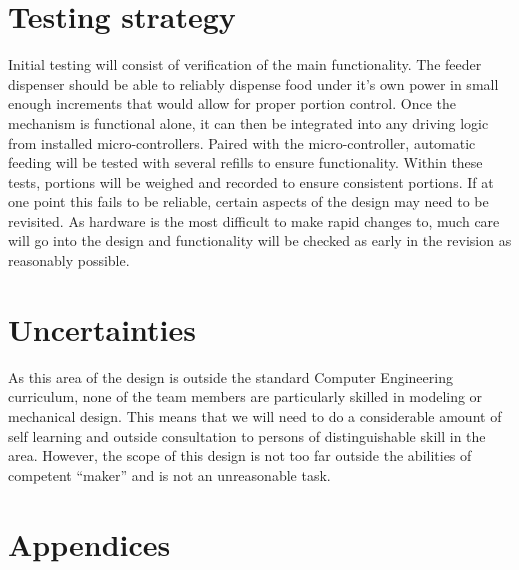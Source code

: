 \documentclass[12pt]{article}
\begin{document}
\section{Testing strategy}
Initial testing will consist of verification of the main functionality. The feeder dispenser should be able to reliably dispense food under it’s own power in small enough increments that would allow for proper portion control. Once the mechanism is functional alone, it can then be integrated into any driving logic from installed micro-controllers. Paired with the micro-controller, automatic feeding will be tested with several refills to ensure functionality. Within these tests, portions will be weighed and recorded to ensure consistent portions. If at one point this fails to be reliable, certain aspects of the design may need to be revisited. As hardware is the most difficult to make rapid changes to, much care will go into the design and functionality will be checked as early in the revision as reasonably possible.
\section{Uncertainties}
As this area of the design is outside the standard Computer Engineering curriculum, none of the team members are particularly skilled in modeling or mechanical design. This means that we will need to do a considerable amount of self learning and outside consultation to persons of distinguishable skill in the area. However, the scope of this design is not too far outside the abilities of competent “maker” and is not an unreasonable task.

\section{Appendices}
\end{document}
